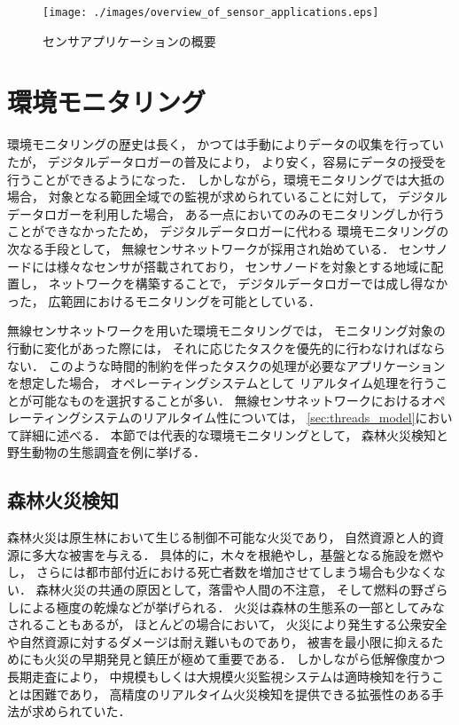 \begin{figure}[htbp]
 \begin{center}
  \texttt{[image: ./images/overview\_of\_sensor\_applications.eps]}
 \end{center}
 \caption{センサアプリケーションの概要}
 \label{fig:overview_of_sensor_applications}
\end{figure}




\section{環境モニタリング}\label{sec:environmental_monitoring}
環境モニタリングの歴史は長く，
かつては手動によりデータの収集を行っていたが，
デジタルデータロガーの普及により，
より安く，容易にデータの授受を行うことができるようになった．
しかしながら，環境モニタリングでは大抵の場合，
対象となる範囲全域での監視が求められていることに対して，
デジタルデータロガーを利用した場合，
ある一点においてのみのモニタリングしか行うことができなかったため，
デジタルデータロガーに代わる
環境モニタリングの次なる手段として，
無線センサネットワークが採用され始めている．
センサノードには様々なセンサが搭載されており，
センサノードを対象とする地域に配置し，
ネットワークを構築することで，
デジタルデータロガーでは成し得なかった，
広範囲におけるモニタリングを可能としている．

無線センサネットワークを用いた環境モニタリングでは，
モニタリング対象の行動に変化があった際には，
それに応じたタスクを優先的に行わなければならない．
このような時間的制約を伴ったタスクの処理が必要なアプリケーションを想定した場合，
オペレーティングシステムとして
リアルタイム処理を行うことが可能なものを選択することが多い．
無線センサネットワークにおけるオペレーティングシステムのリアルタイム性については，
\ref{sec:threads_model}において詳細に述べる．
本節では代表的な環境モニタリングとして，
森林火災検知と野生動物の生態調査を例に挙げる．




\subsection{森林火災検知}
森林火災は原生林において生じる制御不可能な火災であり，
自然資源と人的資源に多大な被害を与える．
具体的に，木々を根絶やし，基盤となる施設を燃やし，
さらには都市部付近における死亡者数を増加させてしまう場合も少なくない．
森林火災の共通の原因として，落雷や人間の不注意，
そして燃料の野ざらしによる極度の乾燥などが挙げられる．
火災は森林の生態系の一部としてみなされることもあるが，
ほとんどの場合において，
火災により発生する公衆安全や自然資源に対するダメージは耐え難いものであり，
被害を最小限に抑えるためにも火災の早期発見と鎮圧が極めて重要である．
しかしながら低解像度かつ長期走査により，
中規模もしくは大規模火災監視システムは適時検知を行うことは困難であり，
高精度のリアルタイム火災検知を提供できる拡張性のある手法が求められていた．

